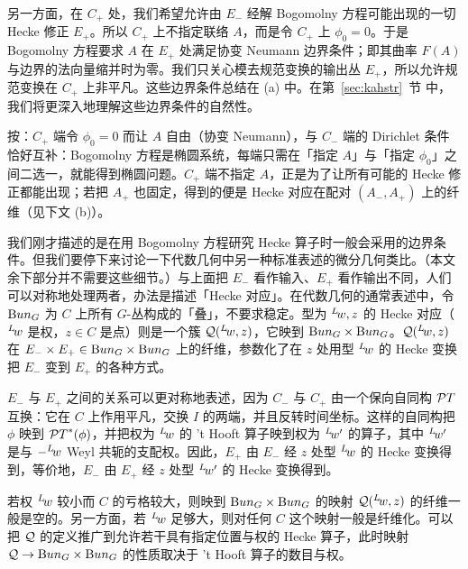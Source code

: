 另一方面，在 $C_+$ 处，我们希望允许由 $E_-$ 经解 Bogomolny 方程可能出现的一切 Hecke 修正 $E_+$。所以 $C_+$ 上不指定联络 $A$，而是令 $C_+$ 上 $\phi_0=0$。于是 Bogomolny 方程要求 $A$ 在 $E_+$ 处满足协变 Neumann 边界条件；即其曲率 $F(A)$ 与边界的法向量缩并时为零。我们只关心模去规范变换的输出丛 $E_+$，所以允许规范变换在 $C_+$ 上非平凡。这些边界条件总结在 \utampo(a) 中。在第~\ref{sec:kahstr}~节 中，我们将更深入地理解这些边界条件的自然性。

\begin{yizhu}[物理图像]
按：$C_+$ 端令 $\phi_0=0$ 而让 $A$ 自由（协变 Neumann），与 $C_-$ 端的 Dirichlet 条件恰好互补：Bogomolny 方程是椭圆系统，每端只需在「指定 $A$」与「指定 $\phi_0$」之间二选一，就能得到椭圆问题。$C_+$ 端不指定 $A$，正是为了让所有可能的 Hecke 修正都能出现；若把 $A_+$ 也固定，得到的便是 Hecke 对应在配对 $(A_-,A_+)$ 上的纤维（见下文 \utampo(b)）。
\end{yizhu}

\par{}

我们刚才描述的是在用 Bogomolny 方程研究 Hecke 算子时一般会采用的边界条件。但我们要停下来讨论一下代数几何中另一种标准表述的微分几何类比。（本文余下部分并不需要这些细节。）与上面把 $E_-$ 看作输入、$E_+$ 看作输出不同，人们可以对称地处理两者，办法是描述「Hecke 对应」。在代数几何的通常表述中，令 ${\rm Bun}_G$ 为 $C$ 上所有 $G$-丛构成的「叠」，不要求稳定。型为 $^L\negthinspace w,z$ 的 Hecke 对应（$^L\negthinspace w$ 是权，$z\in C$ 是点）则是一个簇 ${\cal Q}(^L\negthinspace w,z)$，它映到 ${\rm Bun}_G\times {\rm Bun}_G$。${\cal Q}(^L\negthinspace w,z)$ 在 $E_-\times E_+\in {\rm Bun}_G\times {\rm Bun}_G$ 上的纤维，参数化了在 $z$ 处用型 $^L\negthinspace w$ 的 Hecke 变换把 $E_-$ 变到 $E_+$ 的各种方式。


$E_-$ 与 $E_+$ 之间的关系可以更对称地表述，因为 $C_-$ 与 $C_+$ 由一个保向自同构 ${\cal PT}$ 互换：它在 $C$ 上作用平凡，交换 $I$ 的两端，并且反转时间坐标。这样的自同构把 $\phi$ 映到 ${\cal PT}^*(\phi)$，并把权为 $^L\negthinspace w$ 的 't Hooft 算子映到权为 $^L\negthinspace w'$ 的算子，其中 $^L\negthinspace w'$ 是与 $-{}^L\negthinspace w$ Weyl 共轭的支配权。因此，$E_+$ 由 $E_-$ 经 $z$ 处型 $^L\negthinspace w$ 的 Hecke 变换得到，等价地，$E_-$ 由 $E_+$ 经 $z$ 处型 $^L\negthinspace w'$ 的 Hecke 变换得到。

若权 $^L\negthinspace w$ 较小而 $C$ 的亏格较大，则映到 ${\rm Bun}_G\times {\rm Bun}_G$ 的映射 ${\cal Q}({}^L\negthinspace w,z)$ 的纤维一般是空的。另一方面，若 $^L\negthinspace w$ 足够大，则对任何 $C$ 这个映射一般是纤维化。可以把 ${\cal Q}$ 的定义推广到允许若干具有指定位置与权的 Hecke 算子，此时映射 ${\cal Q}\to {\rm Bun}_G\times {\rm Bun}_G$ 的性质取决于 't Hooft 算子的数目与权。

